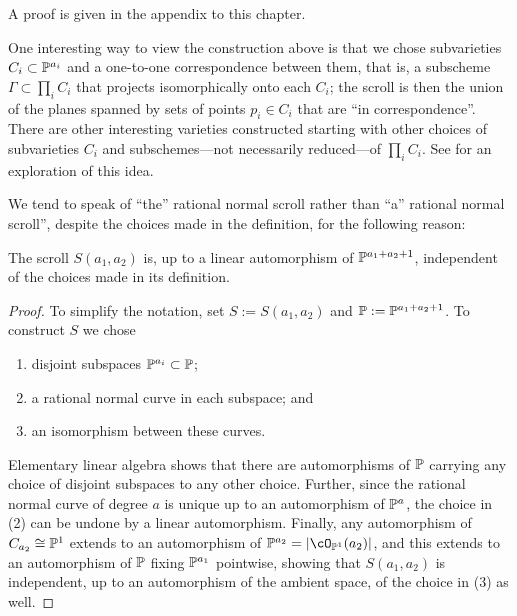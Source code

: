 A proof is given in the appendix to this chapter.

One interesting way to view the construction above is that we chose subvarieties $C_{i}\subset \PP^{a_{i}}$ and a one-to-one correspondence between them, that is, a subscheme
$\Gamma\subset \prod_{i}C_{i}$ that projects isomorphically onto each $C_{i}$; the scroll is then the
union of the planes spanned by sets of points $p_{i}\in C_{i}$ that are ``in correspondence''. There are other interesting varieties constructed starting with other choices of subvarieties $C_{i}$ and subschemes---not necessarily reduced---of $\prod_{i}C_{i}$. See \cite{Eisenbud-Sammartano} for an exploration of this idea.

We tend to speak of ``the'' rational normal scroll rather than ``a'' rational normal scroll'', despite the choices made in the definition, for the following reason:

\begin{proposition}\label{uniqueness of scrolls}
The scroll $S(a_1,a_2)$ is, up to a linear automorphism of $\PP^{a_1+a_2+1}$, independent of the choices made in its
 definition. 
\end{proposition}
\begin{proof} 
To simplify the notation, set $S := S(a_{1}, a_{2})$ and $\PP := \PP^{a_1+a_2+1}$.
To construct $S$ we chose 
\begin{enumerate}
 \item disjoint subspaces $\PP^{a_i}\subset \PP$;
 \item a rational normal curve in each subspace; and
 \item an isomorphism between these curves.
\end{enumerate}
Elementary linear algebra shows that there are automorphisms of $\PP$ carrying any choice of disjoint subspaces to any other choice. Further, since the rational normal curve of degree $a$ is unique up to an automorphism of $\PP^{a}$, the choice in (2) can be undone by a linear automorphism. Finally, any automorphism of $C_{a_{2}}\cong \PP^{1}$ extends to an automorphism of $\PP^{a_{2}} = |\cO_{\PP^{1}}(a_{2})|$, and this extends to an automorphism of $\PP$ fixing $\PP^{a_{1}}$ pointwise,
showing that $S(a_{1}, a_{2})$ is independent, up to an automorphism of the ambient space, of the choice in (3)  as well.
\end{proof}



